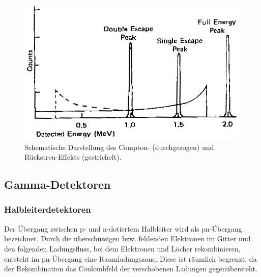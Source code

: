 \documentclass[
	a4paper,
	12pt,
	pagesize,
	ngerman
]{scrartcl}
\begin{document}
		\begin{figure}[H]
				\includegraphics[width= 0.75 \linewidth]{charts/Spektrumschema}
				\caption{
					Schematische Darstellung des Compton- (durchgezogen) und Rückstreu-Effekts (gestrichelt).
					\cite{Anleitung}
				}
				\label{fig_Gammaspektrum}
		\end{figure}


	\subsection{Gamma-Detektoren}

	\subsubsection{Halbleiterdetektoren}

	Der Übergang zwischen p- und n-dotiertem Halbleiter wird als pn-Übergang bezeichnet.
	Durch die überschüssigen bzw. fehlenden Elektronen im Gitter und den folgenden Ladungsfluss, bei dem Elektronen und Löcher rekombinieren, entsteht im pn-Übergang eine Raumladungszone.
	Diese ist räumlich begrenzt, da der Rekombination das Coulombfeld der verschobenen Ladungen gegenübersteht.
\end{document}
